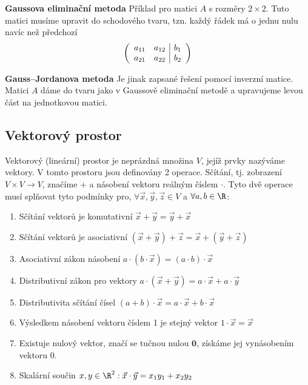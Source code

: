 \textbf{Gaussova eliminační metoda}
Příklad pro matici $A$ s rozměry $2\times 2$. Tuto matici musíme upravit do schodového tvaru, tzn. každý řádek má o jednu nulu navíc než předchozí
\begin{equation}
\left(
\begin{array}{c c | c}
a_{11} & a_{12} & b_1 \\
a_{21} & a_{22} & b_2
\end{array}
\right)
\end{equation}

\textbf{Gauss--Jordanova metoda} Je jinak zapsané řešení pomocí inverzní matice. Matici $A$ dáme do tvaru jako v Gaussově eliminační metodě a upravujeme levou část na jednotkovou matici.

\subsection{Vektorový prostor}
Vektorový (lineární) prostor je neprázdná množina $V$, jejíž prvky nazýváme vektory. V tomto prostoru jsou definovány 2 operace. Sčítání, tj. zobrazení $V \times V \rightarrow V$, značíme $+$ a násobení vektoru reálným číslem $\cdot$. Tyto dvě operace musí splňovat tyto podmínky pro, $\forall \vec{x},\vec{y},\vec{z} \in V$ a $\forall a,b \in \R$:
\begin{enumerate}
\item Sčítání vektorů je komutativní $\vec{x} + \vec{y} = \vec{y}+\vec{x}$
\item Sčítání vektorů je asociativní $(\vec{x}+\vec{y})+\vec{z} = \vec{x}+(\vec{y}+\vec{z})$
\item Asociativní zákon násobení $a\cdot(b\cdot\vec{x}) = (a\cdot b)\cdot\vec{x}$
\item Distributivní zákon pro vektory $a\cdot(\vec{x}+\vec{y}) = a\cdot\vec{x} + a\cdot\vec{y}$
\item Distributivita sčítání čísel $(a+b)\cdot \vec{x} = a\cdot \vec{x} + b\cdot \vec{x}$
\item Výsledkem násobení vektoru číslem 1 je stejný vektor $1 \cdot \vec{x} = \vec x$
\item Existuje nulový vektor, značí se tučnou nulou $\textbf{0}$, získáme jej vynásobením vektoru 0.
\item Skalární součin $x,y\in \R^2 : \vec{x}\cdot\vec{y} = x_1 y_1 + x_2 y_2$
\end{enumerate}
